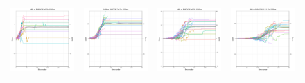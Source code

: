 \begin{figure}
\begin{tabular}{cccc}
\hspace{-0.5cm}\includegraphics[width = 1.55in]{images/Visualizations/ANNvsRANDOM/1000ms5x5.png} &
\hspace{-0.5cm}\includegraphics[width = 1.55in]{images/Visualizations/ANNvsRANDOM/1000ms7x7.png} &
\hspace{-0.5cm}\includegraphics[width = 1.55in]{images/Visualizations/ANNvsRANDOM/1000ms9x9.png} &
\hspace{-0.5cm}\includegraphics[width = 1.55in]{images/Visualizations/ANNvsRANDOM/1000ms11x11.png} \\


\end{tabular}
\end{figure}
